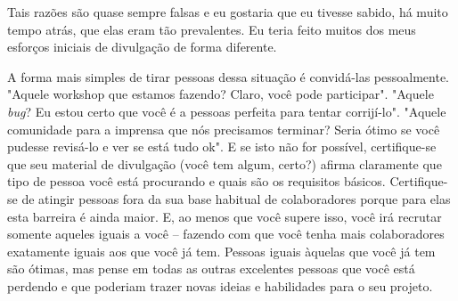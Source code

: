Tais razões são quase sempre falsas e eu gostaria que eu tivesse sabido, há muito tempo atrás, que
elas eram tão prevalentes. Eu teria feito muitos dos meus esforços iniciais de divulgação
de forma diferente.

A forma mais simples de tirar pessoas dessa situação é convidá-las pessoalmente.
"Aquele workshop que estamos fazendo? Claro, você pode participar". "Aquele
\textit{bug}? Eu estou certo que você é a pessoas perfeita para tentar corrijí-lo".
"Aquele comunidade para a imprensa que nós precisamos terminar? Seria ótimo se
você pudesse revisá-lo e ver se está tudo ok". E se isto não for possível, certifique-se
que seu material de divulgação (você tem algum, certo?) afirma claramente que tipo
de pessoa você está procurando e quais são os requisitos básicos. Certifique-se de
atingir pessoas fora da sua base habitual de colaboradores porque para elas esta
barreira é ainda maior. E, ao menos que você supere isso, você irá recrutar somente
aqueles iguais a você -- fazendo com que você tenha mais colaboradores exatamente
iguais aos que você já tem. Pessoas iguais àquelas que você já tem são ótimas,
mas pense em todas as outras excelentes pessoas que você está perdendo e que poderiam
trazer novas ideias e habilidades para o seu projeto.

